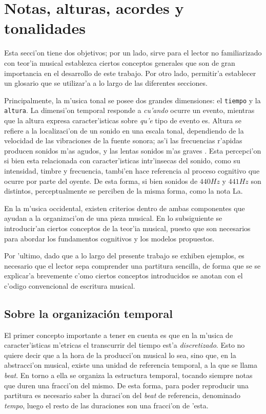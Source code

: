 \section{Notas, alturas, acordes y tonalidades}
\label{sec:musical_intro}
Esta secci'on tiene dos objetivos; por un lado, sirve para el lector no familiarizado con teor'ia musical establezca
ciertos conceptos generales que son de gran importancia en el desarrollo de este trabajo. Por otro lado, permitir'a establecer un glosario
que se utilizar'a a lo largo de las diferentes secciones.

Principalmente, la m'usica tonal se posee dos grandes dimensiones: el \texttt{tiempo} y la \texttt{altura}. 
La dimensi'on temporal responde a \emph{cu'ando} ocurre un evento, mientras que la altura expresa caracter'isticas sobre \emph{qu'e}
tipo de evento es. Altura se refiere a la localizaci'on de un sonido en una escala tonal, dependiendo de la velocidad de las vibraciones de la fuente sonora; 
as'i las frecuencias r'apidas producen sonidos m'as agudos, y las lentas sonidos m'as graves \citep[p. 565]{kennedy1996oxford}.
Esta percepci'on si bien esta relacionada con caracter'isticas intr'insecas del sonido, como su intensidad, timbre y frecuencia, 
tambi'en hace referencia
al proceso cognitivo que ocurre por parte del oyente. De esta forma, si bien sonidos de $440Hz$ y $441Hz$ son distintos, perceptualmente se perciben de la
misma forma, como la nota La.

En la m'usica occidental, existen criterios dentro de ambas componentes que ayudan a la organizaci'on de una pieza musical. 
En lo subsiguiente se introducir'an ciertos conceptos de la teor'ia musical, puesto que son necesarios
para abordar los fundamentos cognitivos y los modelos propuestos. 

Por 'ultimo, dado que a lo largo del presente trabajo se exhiben ejemplos, es necesario que el lector sepa comprender una partitura sencilla, de forma que se se 
explicar'a brevemente c'omo ciertos conceptos introducidos se anotan con el c'odigo convencional de escritura musical.

\subsection{Sobre la organizaci\'on temporal}

El primer concepto importante a tener en cuenta es que en la m'usica de caracter'isticas m'etricas el transcurrir del tiempo est'a \emph{discretizado}. Esto no quiere decir que a la hora de la producci'on musical lo sea, sino que, 
en la abstracci'on musical, existe una unidad de referencia temporal, a la que se llama \emph{beat}. En torno a ella se organiza la estructura temporal, tocando
siempre notas que duren una fracci'on del mismo. De esta forma, para poder reproducir una partitura es necesario saber 
la duraci'on del \emph{beat} de referencia, denominado \emph{tempo}, luego el resto de las duraciones son una fracci'on de 'esta.


